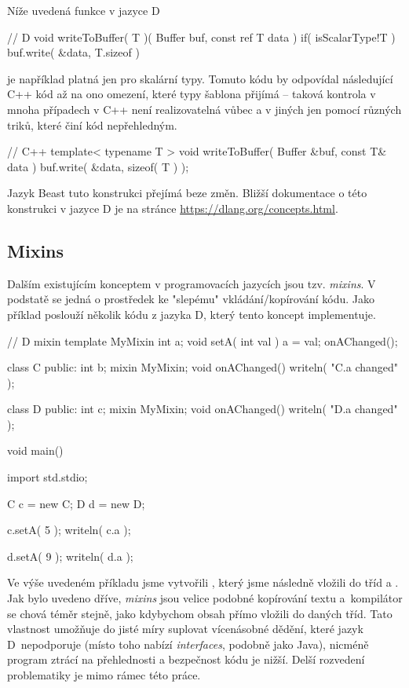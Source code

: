 Níže uvedená funkce v jazyce D
\begin{dcode}
// D
void writeToBuffer( T )( Buffer buf, const ref T data )
	if( isScalarType!T )
{
	buf.write( &data, T.sizeof )
}
\end{dcode}
je například platná jen pro skalární typy. Tomuto kódu by odpovídal následující C++ kód až na ono omezení, které typy šablona přijímá -- taková kontrola v mnoha případech v C++ není realizovatelná vůbec a v jiných jen pomocí různých triků, které činí kód nepřehledným.

\begin{cppcode}
// C++
template< typename T >
void writeToBuffer( Buffer &buf, const T& data ) {
	buf.write( &data, sizeof( T ) );
}
\end{cppcode}

Jazyk Beast tuto konstrukci přejímá beze změn. Bližší dokumentace o této konstrukci v jazyce D je na stránce \url{https://dlang.org/concepts.html}.

\subsection{Mixins}
Dalším existujícím konceptem v programovacích jazycích jsou tzv. \textit{mixins}. V podstatě se jedná o prostředek ke "slepému" vkládání/kopírování kódu. Jako příklad poslouží několik kódu z jazyka D, který tento koncept implementuje.

\begin{dcode}
// D
mixin template MyMixin {
	int a;	
	void setA( int val ) {
		a = val;	
		onAChanged();
	}
}

class C {
public:
	int b;
	mixin MyMixin;
	void onAChanged() {
		writeln( "C.a changed" );	
	}
}

class D {
public:
	int c;
	mixin MyMixin;	
	void onAChanged() {
		writeln( "D.a changed" );	
	}
}

void main() {
	import std.stdio;
	
	C c = new C;
	D d = new D;
	
	c.setA( 5 );
	writeln( c.a );
	
	d.setA( 9 );
	writeln( d.a );
}
\end{dcode}

Ve výše uvedeném příkladu jsme vytvořili , který jsme následně vložili do tříd  a . Jak bylo uvedeno dříve, \textit{mixins} jsou velice podobné kopírování textu a~kompilátor se chová téměr stejně, jako kdybychom obsah  přímo vložili do daných tříd. Tato vlastnost umožňuje do jisté míry suplovat vícenásobné dědění, které jazyk D~nepodporuje (místo toho nabízí \textit{interfaces}, podobně jako Java), nicméně program ztrácí na přehlednosti a bezpečnost kódu je nižší. Delší rozvedení problematiky je mimo rámec této práce.

